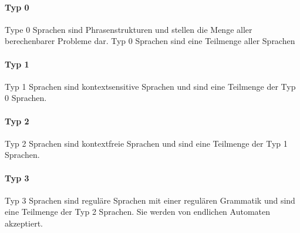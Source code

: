 \documentclass[../main.tex]{subfiles}
\begin{document}
            \paragraph{Typ 0}
                Type 0 Sprachen sind Phrasenstrukturen und stellen die Menge aller berechenbarer Probleme dar. Typ 0 Sprachen sind eine Teilmenge aller Sprachen
                
            \paragraph{Typ 1}
                Typ 1 Sprachen sind kontextsensitive Sprachen und sind eine Teilmenge der Typ 0 Sprachen.
                
            \paragraph{Typ 2}
                Typ 2 Sprachen sind kontextfreie Sprachen und sind eine Teilmenge der Typ 1 Sprachen.
                
            \paragraph{Typ 3}
                Typ 3 Sprachen sind reguläre Sprachen mit einer regulären Grammatik und sind eine Teilmenge der Typ 2 Sprachen. Sie werden von endlichen Automaten akzeptiert.
\end{document}

